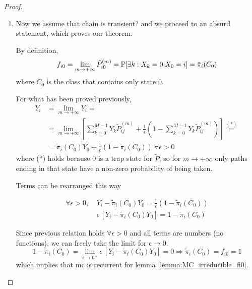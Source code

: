 \begin{proof}
\begin{enumerate}
		\item
		Now we assume that chain is transient? and we proceed to an absurd statement, which proves our theorem.

		By definition,
		$$ f_{i0} = \lim_{m \to +\infty} \tilde{P}_{i0}^{(m)} = \mathbb{P}[\exists k : X_k = 0 | X_0 = i] = \tilde{\pi}_i(C_0)$$
		where $C_0$ is the class that contains only state 0.

		For what has been proved previously,
		\begin{equation}\begin{split}
			Y_i & = \lim_{m \to +\infty} Y_i = \\
				& = \lim_{m \to +\infty} \left[ \sum_{k=0}^{M-1} Y_k \tilde{P}_{ij}^{(m)}
					+ \frac{1}{\epsilon} \left( 1 - \sum_{k=0}^{M-1} Y_k \tilde{P}_{ij}^{(m)} \right) \right] \stackrel{(*)}{=} \\
			& = \tilde{\pi}_i(C_0) Y_0 + \frac{1}{\epsilon} \left( 1 - \tilde{\pi}_i(C_0) \right) ~ \forall \epsilon > 0
		\end{split}\end{equation}
		where (*) holds because 0 is a trap state for $\tilde{P}$, so for $m \to +\infty$ only paths ending in that state have a non-zero probability of being taken.

		Terms can be rearranged this way

		\begin{equation*}\begin{split}
			\forall \epsilon > 0, ~ & Y_i - \tilde{\pi}_i(C_0) Y_0 = \frac{1}{\epsilon} \left( 1 - \tilde{\pi}_i(C_0) \right) \\
			& \epsilon \, [Y_i - \tilde{\pi}_i(C_0) Y_0] = 1 - \tilde{\pi}_i(C_0)
		\end{split}\end{equation*}

		Since previous relation holds $\forall \epsilon > 0$ and all terms are numbers (no functions), we can freely take the limit for $\epsilon \to 0$.
		$$ 1 - \tilde{\pi}_i(C_0) = \lim_{\epsilon \to 0^{+}} \epsilon \, [Y_i - \tilde{\pi}_i(C_0) Y_0] = 0 \Rightarrow \tilde{\pi}_i(C_0) = f_{i0} = 1$$
		which implies that \gls{mc} is recurrent for lemma \ref{lemma:MC_irreducible_fi0}.
		\end{enumerate}
	\end{proof}
